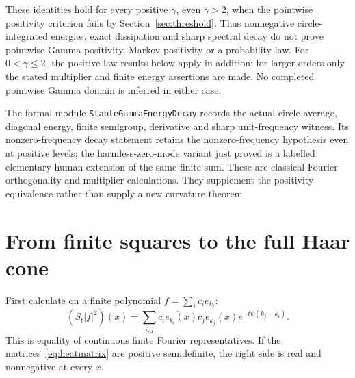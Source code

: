 \documentclass[11pt]{article}
\theoremstyle{remark}\newtheorem{remark}[theorem]{Remark}
\newcommand{\code}[1]{{\small\nolinkurl{#1}}}
\begin{document}
These identities hold for every positive $\gamma$, even
$\gamma>2$, when the pointwise positivity criterion fails by
Section~\ref{sec:threshold}. Thus nonnegative circle-integrated
energies, exact dissipation and sharp spectral decay do not prove
pointwise Gamma positivity, Markov positivity or a probability law.
For $0<\gamma\leq2$, the positive-law results below apply in
addition; for larger orders only the stated multiplier and finite
energy assertions are made. No completed pointwise Gamma domain is
inferred in either case.

The formal module \code{StableGammaEnergyDecay} records the actual
circle average, diagonal energy, finite semigroup, derivative and
sharp unit-frequency witness. Its nonzero-frequency decay statement
retains the nonzero-frequency hypothesis even at positive levels;
the harmless-zero-mode variant just proved is a labelled elementary
human extension of the same finite sum. These are classical Fourier
orthogonality and multiplier calculations. They supplement the
positivity equivalence rather than supply a new curvature theorem.

\section{From finite squares to the full Haar cone}
First calculate on a finite polynomial $f=\sum_i c_i e_{k_i}$:
\begin{equation}\label{eq:squareheat}
 (S_t|f|^2)(x)=\sum_{i,j}
      \overline{c_i e_{k_i}(x)}c_j e_{k_j}(x)
                         e^{-t\psi(k_j-k_i)}.
\end{equation}
This is equality of continuous finite Fourier representatives.
If the matrices~\eqref{eq:heatmatrix} are positive semidefinite,
the right side is real and nonnegative at every $x$.
\end{document}

